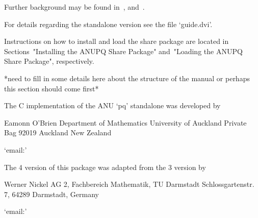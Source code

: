 \endlist

Further   background   may   be   found   in~\cite{OBr95},   \cite{Vau84}
and~\cite{NNN98}.

For details regarding the standalone version see the file `guide.dvi'.


Instructions on how to install and load the {\ANUPQ}  share  package  are
located in Sections~"Installing the ANUPQ Share Package" and~"Loading the
ANUPQ Share Package", respectively.

*need to fill in some details here about the structure of the manual
 or perhaps this section should come first*


The C implementation of the ANU `pq' standalone was developed by

\begintt
Eamonn O'Brien
Department of Mathematics
University of Auckland
Private Bag 92019
Auckland
New Zealand
\endtt

{}`email:' 

The {\GAP} 4 version of this package was adapted from the {\GAP} 3
version by  

\begintt
Werner Nickel
AG 2, Fachbereich Mathematik, TU Darmstadt
Schlossgartenstr. 7, 64289 Darmstadt, Germany
\endtt

{}`email:' 


